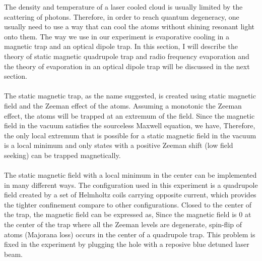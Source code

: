 The density and temperature of a laser cooled cloud is usually limited by the scattering of photons. Therefore, in order to reach quantum degeneracy, one usually need to use a way that can cool the atoms without shining resonant light onto them. The way we use in our experiment is evaporative cooling in a magnetic trap and an optical dipole trap. In this section, I will describe the theory of static magnetic quadrupole trap and radio frequency evaporation and the theory of evaporation in an optical dipole trap will be discussed in the next section.\\
\\
The static magnetic trap, as the name suggested, is created using static magnetic field and the Zeeman effect of the atoms. Assuming a monotonic the Zeeman effect, the atoms will be trapped at an extremum of the field. Since the magnetic field in the vacuum satisfies the sourceless Maxwell equation, we have,
Therefore, the only local extremum that is possible for a static magnetic field in the vacuum is a local minimum and only states with a positive Zeeman shift (low field seeking) can be trapped magnetically.\\
\\
The static magnetic field with a local minimum in the center can be implemented in many different ways. The configuration used in this experiment is a quadrupole field created by a set of Helmholtz coils carrying opposite current, which provides the tighter confinement compare to other configurations. Closed to the center of the trap, the magnetic field can be expressed as,
Since the magnetic field is $0$ at the center of the trap where all the Zeeman levels are degenerate, spin-flip of atoms (Majorana loss) occurs in the center of a quadrupole trap. This problem is fixed in the experiment by plugging the hole with a reposive blue detuned laser beam.\\
